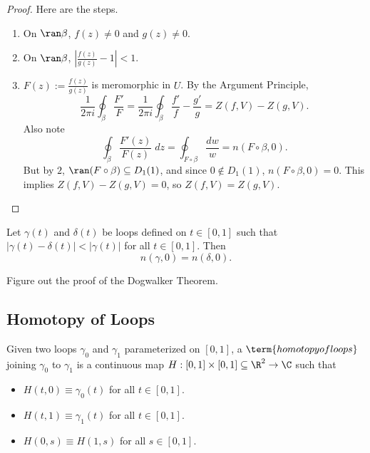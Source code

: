 \begin{proof}
    Here are the steps.
    \begin{enumerate}
        \item On $\ran \beta$, $f(z) \ne 0$ and $g(z) \ne 0$.
        \item On $\ran \beta$, $\left|\frac{f(z)}{g(z)}-1\right| < 1$.
        \item $F(z) := \frac{f(z)}{g(z)}$ is meromorphic in $U$.
            By the Argument Principle,
            \[ \frac{1}{2\pi i} \oint_{\beta} \frac{F'}{F} =
                \frac{1}{2\pi i} \oint_{\beta} \frac{f'}{f} - \frac{g'}{g}
            = Z(f, V) - Z(g, V). \]
            Also note
            \[ \oint_{\beta} \frac{F'(z)}{F(z)} \; dz = 
                \oint_{F \circ \beta} \frac{dw}{w} = n(F \circ \beta, 0).
            \]
            But by $2$, $\ran (F \circ \beta) \subseteq D_1(1)$, and
            since $0 \notin D_1(1)$, $n(F \circ \beta, 0) = 0$.
            This implies $Z(f, V) - Z(g, V) = 0$, so $Z(f, V) = Z(g, V)$.
    \end{enumerate}
\end{proof}

\begin{theorem}
    Let $\gamma(t)$ and $\delta(t)$ be loops defined on $t \in [0,1]$
    such that $|\gamma(t) - \delta(t)|
    < |\gamma(t)|$ for all $t \in [0,1]$.
    Then
    \[ n(\gamma, 0) = n(\delta, 0). \]
\end{theorem}

\begin{exercise*}
    Figure out the proof of the Dogwalker Theorem.
\end{exercise*}

\subsection{Homotopy of Loops}

\begin{definition}
    Given two loops $\gamma_0$ and $\gamma_1$ parameterized
    on $[0,1]$, a $\term{homotopy of loops}$ joining $\gamma_0$ to 
    $\gamma_1$ is a continuous map $H : [0,1] \times [0,1] 
    \subseteq \R^2 \to \C$ such that
    \begin{itemize}
        \item $H(t, 0) \equiv \gamma_0(t)$ for all $t \in [0,1]$.
        \item $H(t, 1) \equiv \gamma_1(t)$ for all $t \in [0,1]$.
        \item $H(0, s) \equiv H(1, s)$ for all $s \in [0,1]$.
    \end{itemize}
\end{definition}

